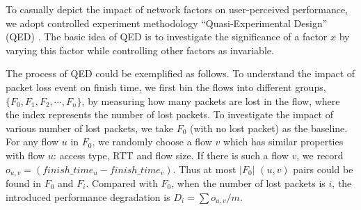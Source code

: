 To casually depict the impact of network factors on user-perceived performance, we adopt controlled experiment methodology ``Quasi-Experimental Design'' (QED) \cite{krishnan2013video}. The basic idea of QED is to investigate the significance of a factor $x$ by varying this factor while controlling other factors as invariable.

The process of QED could be exemplified as follows. To understand the impact of packet loss event on finish time, we first bin the flows into different groups, $\{ F_0, F_1, F_2, \cdots, F_n \}$, by measuring how many packets are lost in the flow, where the index represents the number of lost packets. To investigate the impact of various number of lost packets, we take $F_0$ (\ie with no lost packet) as the baseline. For any flow $u$ in $F_0$, we randomly choose a flow $v$ which has similar properties with flow $u$: access type, RTT and flow size. If there is such a flow $v$, we record $o_{u,v} = (finish\_time_{u} - finish\_time_{v})$. Thus at most $|F_0|$ $(u,v)$ pairs could be found in $F_0$ and $F_i$. Compared with $F_0$, when the number of lost packets is $i$, the introduced performance degradation is $D_{i} = \sum o_{u,v} / m$.